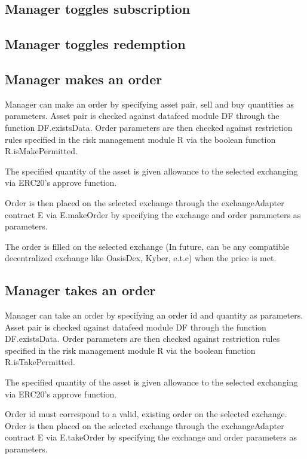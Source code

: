 \documentclass[conference]{IEEEtran}
\begin{document}
\subsection{Manager toggles subscription}

\subsection{Manager toggles redemption}

\subsection{Manager makes an order}

Manager can make an order by specifying asset pair, sell and buy quantities as parameters. Asset pair is checked against datafeed module DF through the function DF.existsData. Order parameters are then checked against restriction rules specified in the risk management module R via the boolean function R.isMakePermitted.

The specified quantity of the asset is given allowance to the selected exchanging via ERC20's approve function.

Order is then placed on the selected exchange through the exchangeAdapter contract E via E.makeOrder by specifying the exchange and order parameters as parameters.

The order is filled on the selected exchange (In future, can be any compatible decentralized exchange like OasisDex, Kyber, e.t.c) when the price is met.

\subsection{Manager takes an order}

Manager can take an order by specifying an order id and quantity as parameters. Asset pair is checked against datafeed module DF through the function DF.existsData. Order parameters are then checked against restriction rules specified in the risk management module R via the boolean function R.isTakePermitted.

The specified quantity of the asset is given allowance to the selected exchanging via ERC20's approve function.

Order id must correspond to a valid, existing order on the selected exchange. Order is then placed on the selected exchange through the exchangeAdapter contract E via E.takeOrder by specifying the exchange and order parameters as parameters.
\end{document}
